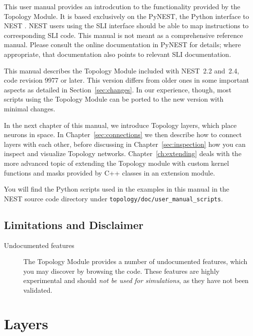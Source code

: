 \documentclass[a4paper,12pt]{report}
\begin{document}
This user manual provides an introdcution to the functionality
provided by the Topology Module. It is based exclusively on the
PyNEST, the Python interface to NEST \citep{Eppl:2008(12)}. NEST users
using the SLI interface should be able to map instructions to
corresponding SLI code. This manual is not meant as a comprehensive
reference manual. Please consult the online documentation in PyNEST
for details; where appropriate, that documentation also points to
relevant SLI documentation.

This manual describes the Topology Module included with NEST~2.2 and~2.4, code
revision 9977 or later.  This version differs from older ones in some
important aspects as detailed in Section~\ref{sec:changes}. In our
experience, though, most scripts using the Topology Module can be
ported to the new version with minimal changes.

In the next chapter of this manual, we introduce Topology layers,
which place neurons in space. In Chapter~\ref{sec:connections} we then
describe how to connect layers with each other, before discussing in
Chapter~\ref{sec:inspection} how you can inspect and visualize
Topology networks. Chapter~\ref{ch:extending} deals with the more advanced
topic of extending the Topology module with custom kernel functions and
masks provided by C++ classes in an extension module.

You will find the Python scripts used in the examples in this manual 
 in the NEST
source code directory under \lstinline!topology/doc/user_manual_scripts!.

\section{Limitations and Disclaimer}\label{sec:limitations}

\begin{description}
\item[Undocumented features] The Topology Module provides a number of undocumented features, which
you may discover by browsing the code. These features are highly
experimental and should \emph{not be used for simulations}, as they
have not been validated.
\end{description}




\chapter{Layers}\label{sec:layers}
\end{document}
